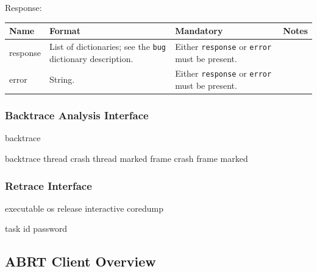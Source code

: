 \documentclass{article}
\begin{document}
Response:

\begin{flushleft}
\begin{tabular}{|l|p{5cm}|p{3cm}|p{5cm}|}
\hline
Name & Format & Mandatory & Notes \\
\hline
response & List of dictionaries; see the \texttt{bug} dictionary description. & Either \texttt{response} or \texttt{error} must be present. & \\
error & String. & Either \texttt{response} or \texttt{error} must be present. & \\
\hline
\end{tabular}
\end{flushleft}

\cleardoublepage
\subsubsection{Backtrace Analysis Interface}

backtrace

backtrace
thread
crash thread marked
frame
crash frame marked


\cleardoublepage
\subsubsection{Retrace Interface}

executable
os release
interactive
coredump

task id
password

\subsection{ABRT Client Overview}
\end{document}
